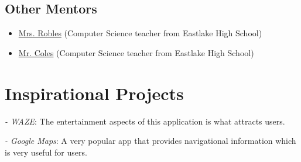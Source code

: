 \documentclass[20pt]{article}
\begin{document}
		\subsection*{Other Mentors}
			\begin{itemize}
				\item \underline{Mrs. Robles} (Computer Science teacher from Eastlake High School)
				\item \underline{Mr. Coles} (Computer Science teacher from Eastlake High School)
			\end{itemize}
		
	\section{Inspirational Projects}
		\begin{description}
			\item \emph{- WAZE}: The entertainment aspects of this application is what attracts users.
			\item \emph{- Google Maps}: A very popular app that provides navigational information which is very useful for users.
		\end{description}
\end{document}
